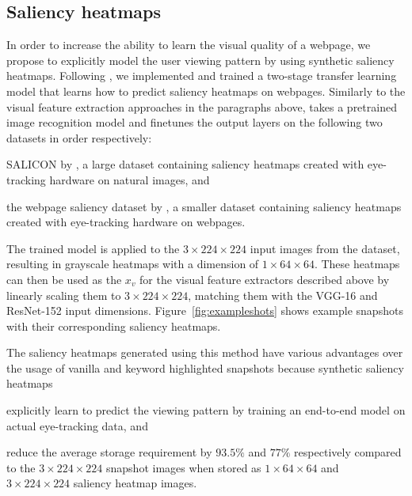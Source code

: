 \subsection{Saliency heatmaps}
In order to increase the ability to learn the visual quality of a webpage, we propose to explicitly model the user viewing pattern by using synthetic saliency heatmaps. 
Following \cite{shan2017two}, we implemented and trained a two-stage transfer learning model that learns how to predict saliency heatmaps on webpages.
Similarly to the visual feature extraction approaches in the paragraphs above, \cite{shan2017two} takes a pretrained image recognition model and finetunes the output layers on the following two datasets in order respectively:
\begin{inparaenum}[(i)]
\item SALICON by \cite{jiang2015salicon}, a large dataset containing saliency heatmaps created with eye-tracking hardware on natural images, and 
\item the webpage saliency dataset by \cite{shen2014webpage}, a smaller dataset containing saliency heatmaps created with eye-tracking hardware on webpages.
\end{inparaenum}

The trained model is applied to the $3\times224\times224$ input images from the \datasetname data\-set, resulting in grayscale heatmaps with a dimension of $1\times64\times64$. These heatmaps can then be used as the $x_{v}$ for the visual feature extractors described above by linearly scaling them to $3\times224\times224$, matching them with the VGG-16 and ResNet-152 input dimensions. Figure~\ref{fig:exampleshots} shows example snapshots with their corresponding saliency heatmaps.

The saliency heatmaps generated using this method have various advantages over the usage of vanilla and keyword highlighted snapshots because synthetic saliency heatmaps
\begin{inparaenum}[(i)]
\item explicitly learn to predict the viewing pattern by training an end-to-end model on actual eye-tracking data, and 
\item reduce the average storage requirement by $93.5\%$ and $77\%$ respectively compared to the $3\times224\times224$ snapshot images when stored as $1\times64\times64$ and $3\times224\times224$ saliency heatmap images.
\end{inparaenum}
